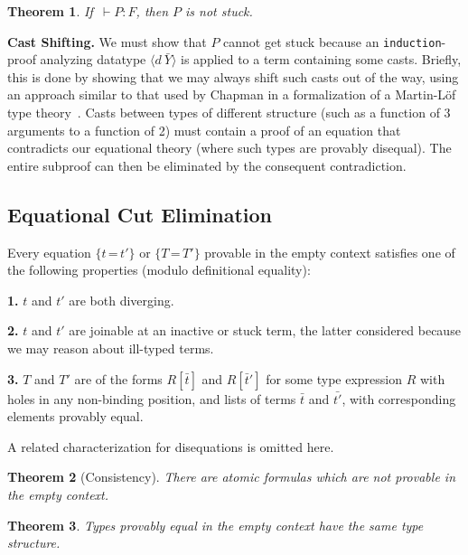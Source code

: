 \documentclass[preprint,natbib]{sigplanconf}
\newcommand{\seq}[3]{#1 \vdash #2 : #3}
\newcommand{\optt}{\textsc{OpTT}}
\newcommand{\Eq}[0]{\texttt{=}}
\newtheorem{theorem}{Theorem}
\begin{document}
\begin{theorem}
If $\seq{\,}{P}{F}$, then $P$ is not stuck.
\end{theorem}

\textbf{Cast Shifting.} We must show that $P$ cannot get stuck because
an \texttt{induction}-proof analyzing datatype $\langle d\ \bar{Y}
\rangle$ is applied to a term containing some casts.  Briefly, this is
done by showing that we may always shift such casts out of the way,
using an approach similar to that used by Chapman in a formalization
of a Martin-L\"of type theory~\cite{chapman08}.  Casts between types
of different structure (such as a function of 3 arguments to a
function of 2) must contain a proof of an equation that contradicts
our equational theory (where such types are provably disequal).  The
entire subproof can then be eliminated by the consequent contradiction.

\subsection{Equational Cut Elimination}
\label{sec:eqcuts}

Every equation $\{t\, \Eq\, t'\}$ or $\{T\,\Eq\, T'\}$ provable in the
empty context satisfies one of the following properties (modulo
definitional equality):

\noindent
\textbf{1.} $t$ and $t'$ are both diverging.

\noindent
\textbf{2.} $t$ and $t'$ are joinable at an inactive or stuck term,
the latter considered because we may reason about ill-typed terms.

\noindent 
\textbf{3.} $T$ and $T'$ are of the forms $R[\bar{t}]$ and $R[\bar{t}']$ for
some type expression $R$ with holes in any non-binding position, and
lists of terms $\bar{t}$ and $\bar{t'}$, with corresponding elements
provably equal.

\noindent A related characterization for disequations is omitted here.

\begin{theorem}[Consistency]
There are atomic formulas which are not provable in the empty context.
\end{theorem}

\begin{theorem}
\label{thm:types}
Types provably equal in the empty context have the same type
structure.
\end{theorem}

\end{document}
